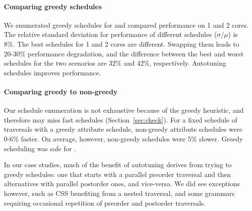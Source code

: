 \paragraph*{Comparing greedy schedules} We enumerated greedy schedules for \hlangpp{} and compared performance on 1 and 2 cores. The relative standard deviation for performance of different schedules ($\sigma / \mu$) is 8\%. The best schedules for 1 and 2 cores are different. Swapping them leads to 20-30\% performance degradation, and the difference between the best and worst schedules for the two scenarios are 32\% and 42\%, respectively. Autotuning schedules improves performance. 

\paragraph*{Comparing greedy to non-greedy}
Our schedule enumeration is not exhaustive because of the greedy heuristic, and therefore may miss fast schedules (Section~\ref{sec:check}).  For a fixed schedule of traversals with a greedy attribute schedule, non-greedy attribute schedules were 0-6\% faster. On average, however,  non-greedy schedules were 5\% slower. Greedy scheduling was safe for \hlangpp{}.

In our case studies, much of the benefit of autotuning derives from trying to greedy schedules: one that starts with a parallel preorder traversal and then alternatives with parallel postorder ones, and vice-versa. We did see exceptions however, such as CSS benefiting from a nested traversal, and some grammars requiring occasional repetition of preorder and postorder traversals. 


